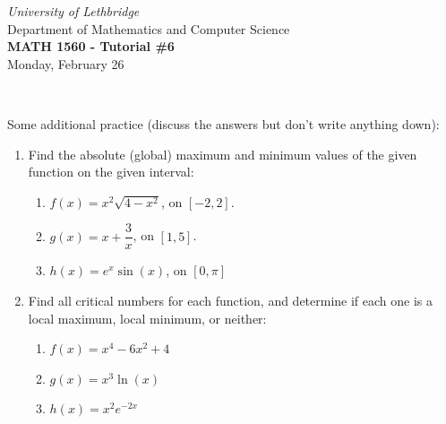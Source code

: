 \documentclass[12pt]{article}
\newcommand{\skipline}{\vspace{12pt}}
\begin{document}
\author{Instructor: Sean Fitzpatrick}
\thispagestyle{empty}
\begin{center}
\emph{University of Lethbridge}\\
Department of Mathematics and Computer Science\\
{\bf MATH 1560 - Tutorial \#6}\\
Monday, February 26
\end{center}
\skipline \ \noindent \skipline

\vspace*{\fill}


Some additional practice (discuss the answers but don't write anything down):
\begin{enumerate}
\item Find the absolute (global) maximum and minimum values of the given function on the given interval:
\begin{enumerate}
\item $f(x) = x^2\sqrt{4-x^2}$, on $[-2,2]$.
\item $g(x) = x+\dfrac{3}{x}$, on $[1,5]$.
\item $h(x) = e^x\sin(x)$, on $[0,\pi]$
\end{enumerate}
\item Find all critical numbers for each function, and determine if each one is a local maximum, local minimum, or neither:
\begin{enumerate}
\item $f(x)=x^4-6x^2+4$
\item $g(x) = x^3\ln(x)$
\item $h(x) = x^2e^{-2x}$
\end{enumerate}
\end{enumerate}




\newpage
\end{document}
